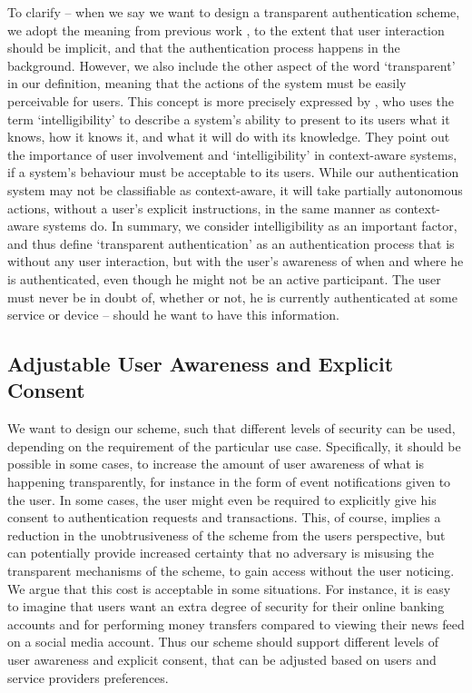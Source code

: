 To clarify -- when we say we want to design a transparent authentication scheme, we adopt the meaning from previous work \cite{bianchi2016wearable, ceccarelli2015continuous, ojala2008wearable}, to the extent that user interaction should be implicit, and that the authentication process happens in the background. However, we also include the other aspect of the word `transparent' in our definition, meaning that the actions of the system must be easily perceivable for users. This concept is more precisely expressed by \citet{bellotti2001intelligibility}, who uses the term `intelligibility' to describe a system's ability to present to its users what it knows, how it knows it, and what it will do with its knowledge. They point out the importance of user involvement and `intelligibility' in context-aware systems, if a system's behaviour must be acceptable to its users. While our authentication system may not be classifiable as context-aware, it will take partially autonomous actions, without a user's explicit instructions, in the same manner as context-aware systems do. 
In summary, we consider intelligibility as an important factor, and thus define `transparent authentication' as an authentication process that is without any user interaction, but with the user's awareness of when and where he is authenticated, even though he might not be an active participant. The user must never be in doubt of, whether or not, he is currently authenticated at some service or device -- should he want to have this information. 

\subsection{Adjustable User Awareness and Explicit Consent}
We want to design our scheme, such that different levels of security can be used, depending on the requirement of the particular use case. Specifically, it should be possible in some cases, to increase the amount of user awareness of what is happening transparently, for instance in the form of event notifications given to the user. In some cases, the user might even be required to explicitly give his consent to authentication requests and transactions.
This, of course, implies a reduction in the unobtrusiveness of the scheme from the users perspective, but can potentially provide increased certainty that no adversary is misusing the transparent mechanisms of the scheme, to gain access without the user noticing. We argue that this cost is acceptable in some situations. For instance, it is easy to imagine that users want an extra degree of security for their online banking accounts and for performing money transfers compared to viewing their news feed on a social media account. 
Thus our scheme should support different levels of user awareness and explicit consent, that can be adjusted based on users and service providers preferences. 

